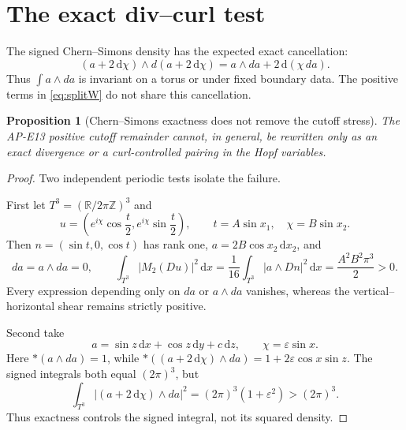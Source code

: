 \documentclass[11pt]{article}
\newtheorem{proposition}[theorem]{Proposition}
\newcommand{\dd}{\,\mathrm d}
\newcommand{\RR}{\mathbb R}
\begin{document}
\section{The exact div--curl test}

The signed Chern--Simons density has the expected exact cancellation:
\begin{equation}
 (a+2\dd\chi)\wedge d(a+2\dd\chi)
 =a\wedge da+2\dd(\chi\,da).                           \label{eq:cs-exact}
\end{equation}
Thus $\int a\wedge da$ is invariant on a torus or under fixed boundary data.
The positive terms in \eqref{eq:splitW} do not share this cancellation.

\begin{proposition}[Chern--Simons exactness does not remove the cutoff stress]
The AP-E13 positive cutoff remainder cannot, in general, be rewritten only
as an exact divergence or a curl-controlled pairing in the Hopf variables.
\end{proposition}

\begin{proof}
Two independent periodic tests isolate the failure.

First let $T^3=(\RR/2\pi\mathbb Z)^3$ and
\begin{equation}
 u=\left(e^{i\chi}\cos\frac t2,
          e^{i\chi}\sin\frac t2\right),\qquad
 t=A\sin x_1,\quad \chi=B\sin x_2.                    \label{eq:shear-lift}
\end{equation}
Then $n=(\sin t,0,\cos t)$ has rank one,
$a=2B\cos x_2\dd x_2$, and
\begin{equation}
 da=a\wedge da=0,\qquad
 \int_{T^3}|M_2(Du)|^2\dd x
 =\frac1{16}\int_{T^3}|a\wedge Dn|^2\dd x
 =\frac{A^2B^2\pi^3}{2}>0.                            \label{eq:shear-positive}
\end{equation}
Every expression depending only on $da$ or $a\wedge da$ vanishes, whereas
the vertical--horizontal shear remains strictly positive.

Second take
\begin{equation}
 a=\sin z\dd x+\cos z\dd y+c\dd z,\qquad
 \chi=\varepsilon\sin x.                              \label{eq:cs-test}
\end{equation}
Here $*(a\wedge da)=1$, while
$*((a+2\dd\chi)\wedge da)=1+2\varepsilon\cos x\sin z$.
The signed integrals both equal $(2\pi)^3$, but
\begin{equation}
 \int_{T^3}|(a+2\dd\chi)\wedge da|^2
 =(2\pi)^3(1+\varepsilon^2)>(2\pi)^3.                 \label{eq:cs-square}
\end{equation}
Thus exactness controls the signed integral, not its squared density.
\end{proof}
\end{document}
